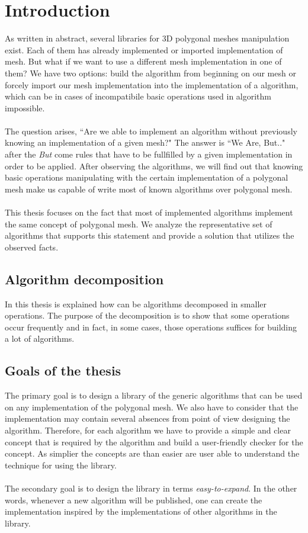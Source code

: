 \chapter*{Introduction}

As written in abstract, several libraries for 3D polygonal meshes manipulation exist.
Each of them has already implemented or imported implementation of mesh. But what if we want to use
a different mesh implementation in one of them? We have two options: build
the algorithm from beginning on our mesh or forcely import our mesh implementation into
the implementation of a algorithm, which can be in cases of incompatibile basic operations
used in algorithm impossible.\\
\\
The question arises, ``Are we able to implement an algorithm without previously knowing an
implementation of a given mesh?" The answer is ``We Are, But.." after the \emph{But} come
rules that have to be fullfilled by a given implementation in order to be applied.
After observing the algorithms, we will find out that
knowing basic operations manipulating with the certain implementation of a polygonal mesh
make us capable of write most of known algorithms over polygonal mesh.\\
\\
This thesis focuses on the fact that most of implemented algorithms implement the
same concept of polygonal mesh. We analyze the representative set of algorithms that
supports this statement and provide a solution that utilizes the observed facts.

\section{Algorithm decomposition}

In this thesis is explained how can be algorithms decomposed in smaller operations.
The purpose of the decomposition is to show that some operations occur frequently
and in fact, in some cases, those operations suffices for building a lot of algorithms.

\section{Goals of the thesis}

The primary goal is to design a library of the generic algorithms that can be used on any
implementation of the polygonal mesh. We also have to consider that the implementation
may contain several absences from point of view designing the algorithm. Therefore, for each
algorithm we have to provide a simple and clear concept that is required by the algorithm
and build a user-friendly checker for the concept. As simplier the concepts are than easier
are user able to understand the technique for using the library.\\
\\
The secondary goal is to design the library in terms \emph{easy-to-expand}. In the other words,
whenever a new algorithm will be published, one can create the implementation inspired
by the implementations of other algorithms in the library.

